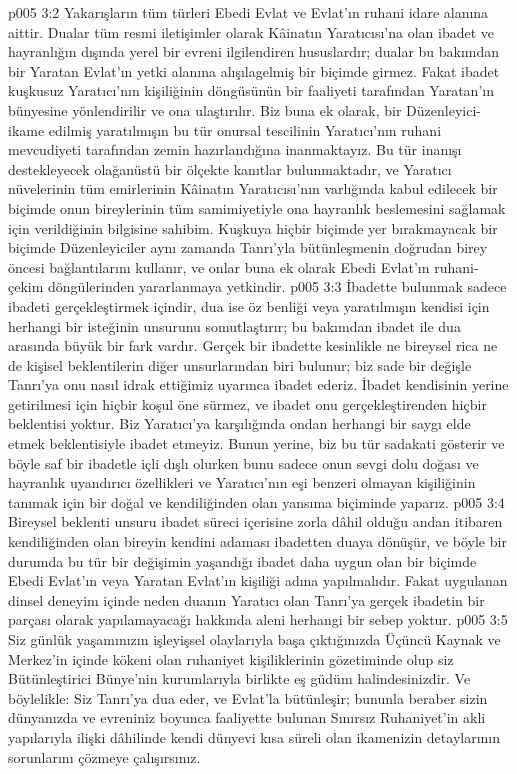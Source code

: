 \vs p005 3:2 Yakarışların tüm türleri Ebedi Evlat ve Evlat’ın ruhani idare alanına aittir. Dualar tüm resmi iletişimler olarak Kâinatın Yaratıcısı’na olan ibadet ve hayranlığın dışında yerel bir evreni ilgilendiren hususlardır; dualar bu bakımdan bir Yaratan Evlat’ın yetki alanına alışılagelmiş bir biçimde girmez. Fakat ibadet kuşkusuz Yaratıcı’nın kişiliğinin döngüsünün bir faaliyeti tarafından Yaratan’ın bünyesine yönlendirilir ve ona ulaştırılır. Biz buna ek olarak, bir Düzenleyici\hyp{}ikame edilmiş yaratılmışın bu tür onursal tescilinin Yaratıcı’nın ruhani mevcudiyeti tarafından zemin hazırlandığına inanmaktayız. Bu tür inanışı destekleyecek olağanüstü bir ölçekte kanıtlar bulunmaktadır, ve Yaratıcı nüvelerinin tüm emirlerinin Kâinatın Yaratıcısı’nın varlığında kabul edilecek bir biçimde onun bireylerinin tüm samimiyetiyle ona hayranlık beslemesini sağlamak için verildiğinin bilgisine sahibim. Kuşkuya hiçbir biçimde yer bırakmayacak bir biçimde Düzenleyiciler aynı zamanda Tanrı’yla bütünleşmenin doğrudan birey öncesi bağlantılarını kullanır, ve onlar buna ek olarak Ebedi Evlat’ın ruhani\hyp{}çekim döngülerinden yararlanmaya yetkindir.
\vs p005 3:3 İbadette bulunmak sadece ibadeti gerçekleştirmek içindir, dua ise öz benliği veya yaratılmışın kendisi için herhangi bir isteğinin unsurunu somutlaştırır; bu bakımdan ibadet ile dua arasında büyük bir fark vardır. Gerçek bir ibadette kesinlikle ne bireysel rica ne de kişisel beklentilerin diğer unsurlarından biri bulunur; biz sade bir değişle Tanrı’ya onu nasıl idrak ettiğimiz uyarınca ibadet ederiz. İbadet kendisinin yerine getirilmesi için hiçbir koşul öne sürmez, ve ibadet onu gerçekleştirenden hiçbir beklentisi yoktur. Biz Yaratıcı’ya karşılığında ondan herhangi bir saygı elde etmek beklentisiyle ibadet etmeyiz. Bunun yerine, biz bu tür sadakati gösterir ve böyle saf bir ibadetle içli dışlı olurken bunu sadece onun sevgi dolu doğası ve hayranlık uyandırıcı özellikleri ve Yaratıcı’nın eşi benzeri olmayan kişiliğinin tanımak için bir doğal ve kendiliğinden olan yansıma biçiminde yaparız.
\vs p005 3:4 Bireysel beklenti unsuru ibadet süreci içerisine zorla dâhil olduğu andan itibaren kendiliğinden olan bireyin kendini adaması ibadetten duaya dönüşür, ve böyle bir durumda bu tür bir değişimin yaşandığı ibadet daha uygun olan bir biçimde Ebedi Evlat’ın veya Yaratan Evlat’ın kişiliği adına yapılmalıdır. Fakat uygulanan dinsel deneyim içinde neden duanın Yaratıcı olan Tanrı’ya gerçek ibadetin bir parçası olarak yapılamayacağı hakkında aleni herhangi bir sebep yoktur.
\vs p005 3:5 Siz günlük yaşamınızın işleyişsel olaylarıyla başa çıktığınızda Üçüncü Kaynak ve Merkez’in içinde kökeni olan ruhaniyet kişiliklerinin gözetiminde olup siz Bütünleştirici Bünye’nin kurumlarıyla birlikte eş güdüm halindesinizdir. Ve böylelikle: Siz Tanrı’ya dua eder, ve Evlat’la bütünleşir; bununla beraber sizin dünyanızda ve evreniniz boyunca faaliyette bulunan Sınırsız Ruhaniyet’in akli yapılarıyla ilişki dâhilinde kendi dünyevi kısa süreli olan ikamenizin detaylarının sorunlarını çözmeye çalışırsınız.
